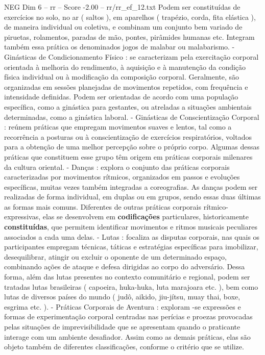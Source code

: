 \begin{textsample}{NEG Dim 6 – rr – Score -2.00 – rr/rr\_ef\_12.txt}
Podem ser constituídas de exercícios no solo, no ar ( saltos ), em aparelhos ( trapézio, corda, fita elástica ), de maneira individual ou coletiva, e combinam um conjunto bem variado de piruetas, rolamentos, paradas de mão, pontes, pirâmides humanas etc.
Integram também essa prática os denominados jogos de malabar ou malabarismo. - Ginásticas de Condicionamento Físico : se caracterizam pela exercitação corporal orientada à melhoria do rendimento, à aquisição e à manutenção da condição física individual ou à modificação da composição corporal.
Geralmente, são organizadas em sessões planejadas de movimentos repetidos, com frequência e intensidade definidas.
Podem ser orientadas de acordo com uma população específica, como a ginástica para gestantes, ou atreladas a situações ambientais determinadas, como a ginástica laboral. - Ginásticas de Conscientização Corporal : reúnem práticas que empregam movimentos suaves e lentos, tal como a recorrência a posturas ou à conscientização de exercícios respiratórios, voltados para a obtenção de uma melhor percepção sobre o próprio corpo.
Algumas dessas práticas que constituem esse grupo têm origem em práticas corporais milenares da cultura oriental. - Danças : explora o conjunto das práticas corporais caracterizadas por movimentos rítmicos, organizados em passos e evoluções específicas, muitas vezes também integradas a coreografias.
As danças podem ser realizadas de forma individual, em duplas ou em grupos, sendo essas duas últimas as formas mais comuns.
Diferentes de outras práticas corporais rítmico-expressivas, elas se desenvolvem em \textbf{codificações} particulares, historicamente \textbf{constituídas}, que permitem identificar movimentos e ritmos musicais peculiares associados a cada uma delas. - Lutas : focaliza as disputas corporais, nas quais os participantes empregam técnicas, táticas e estratégias específicas para imobilizar, desequilibrar, atingir ou excluir o oponente de um determinado espaço, combinando ações de ataque e defesa dirigidas ao corpo do adversário.
Dessa forma, além das lutas presentes no contexto comunitário e regional, podem ser tratadas lutas brasileiras ( capoeira, huka-huka, luta marajoara etc. ), bem como lutas de diversos países do mundo ( judô, aikido, jiu-jítsu, muay thai, boxe, esgrima etc. ). - Práticas Corporais de Aventura : exploram -se expressões e formas de experimentação corporal centradas nas perícias e proezas provocadas pelas situações de imprevisibilidade que se apresentam quando o praticante interage com um ambiente desafiador.
Assim como as demais práticas, elas são objeto também de diferentes classificações, conforme o critério que se utilize.

\end{textsample}
